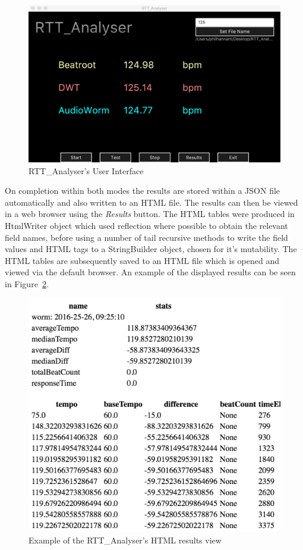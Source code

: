 \documentclass[a4paper, 11pt]{article}
\begin{document}
\begin{figure}[htbp]
\centering
\includegraphics[scale=0.25]{images/rtt.jpg}
\caption{RTT\_Analyser's User Interface}
\label{fig: rtt}
\end{figure}

On completion within both modes the results are stored within a JSON file automatically and also written to an HTML file. The results can then be viewed in a web browser using the \textit{Results} button. The HTML tables were produced in HtmlWriter object which used reflection where possible to obtain the relevant field names, before using a number of tail recursive methods to write the field values and HTML tags to a StringBuilder object, chosen for it's mutability. The HTML tables are subsequently saved to an HTML file which is opened and viewed via the default browser. An example of the displayed results can be seen in Figure~\ref{fig: htmlView}.

\begin{figure}[htbp]
\centering
\includegraphics[scale=0.3]{images/htmlResults.jpg}
\caption{Example of the RTT\_Analyser's HTML results view}
\label{fig: htmlView}
\end{figure}
\end{document}
